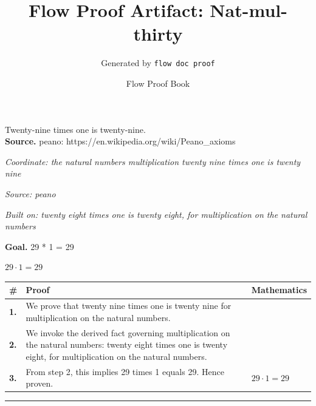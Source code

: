 \documentclass[11pt]{article}
\title{Flow Proof Artifact: Nat-mul-thirty}
\author{Generated by \texttt{flow doc proof}}
\date{Flow Proof Book}
\theoremstyle{definition}
\begin{document}
\maketitle
Twenty-nine times one is twenty-nine.\\[0.5em]
\textbf{Source.} peano: https://en.wikipedia.org/wiki/Peano\_axioms\\[0.5em]
\bigskip
{}\par
\smallskip\noindent\textit{Coordinate: the natural numbers \cdot multiplication \cdot twenty nine times one is twenty nine}\par
\smallskip\noindent\textit{Source: peano}\par
\smallskip\noindent\textit{Built on: twenty eight times one is twenty eight, for multiplication on the natural numbers}\par
\medskip
\noindent\textbf{Goal.} 29 * 1 = 29\par
\noindent$\displaystyle 29 \cdot 1 = 29$\par
\medskip
\noindent
\begin{tabular}{@{} >{\raggedright\arraybackslash}p{} >{\raggedright\arraybackslash}p{} >{\raggedleft\arraybackslash}p{} @{}}
\textbf{\#} & \textbf{Proof} & \textbf{Mathematics} \\
\midrule
\textbf{1.} & We prove that twenty nine times one is twenty nine for multiplication on the natural numbers. & \\[0.45em]
\textbf{2.} & We invoke the derived fact governing multiplication on the natural numbers: twenty eight times one is twenty eight, for multiplication on the natural numbers. & \\[0.45em]
\textbf{3.} & From step 2, this implies 29 times 1 equals 29. Hence proven. & $\displaystyle 29 \cdot 1 = 29$ \\[0.45em]
\bottomrule
\end{tabular}
\label{thm:Nat-multiplication-twenty_nine_times_one_is_twenty_nine}
\par\medskip\hrule
\end{document}
